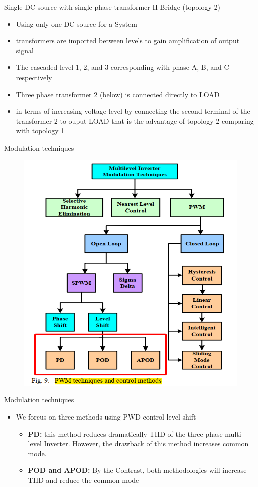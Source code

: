 \documentclass[
	11pt, %
]{beamer}
\begin{document}
\begin{frame}{Single DC source with single phase transformer H-Bridge (topology 2)}
	\begin{itemize}
		\setlength{\itemsep}{8pt}
		\item {Using only one DC source for a System}
		\item {transformers are imported between levels to gain amplification of output signal}
		\item {The cascaded level 1, 2, and 3 corresponding with phase A, B, and C respectively}
		\item {Three phase transformer 2 (below) is connected directly to LOAD}
		\item {in terms of increasing voltage level by connecting the second terminal of the transformer 2 to ouput LOAD
		that is the advantage of topology 2 comparing with topology 1}
	\end{itemize}
\end{frame}

\begin{frame}{Modulation techniques}
    \begin{figure}
        \includegraphics[width=0.45\linewidth]{PWD.png}
    \end{figure}
\end{frame}

\begin{frame}{Modulation techniques}
    \begin{itemize}
		\item {We forcus on three methods using PWD control level shift}
		\begin{itemize}
			\setlength{\itemsep}{10pt}
			\item {\textbf{PD:} this method reduces dramatically THD of the three-phase multi-level Inverter. However, the drawback of this method increases common mode.}
			\item {\textbf{POD and APOD:} By the Contrast, both methodologies will increase THD and reduce the common mode}
		\end{itemize}
	\end{itemize}
\end{frame}
\end{document}
